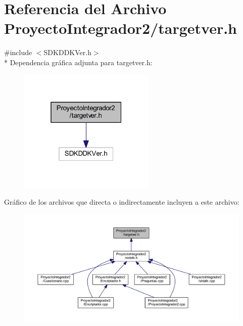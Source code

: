 \section{Referencia del Archivo Proyecto\-Integrador2/targetver.h}
\label{targetver_8h}
{\ttfamily \#include $<$S\-D\-K\-D\-D\-K\-Ver.\-h$>$}\\*
Dependencia gráfica adjunta para targetver.\-h\-:
\nopagebreak
\begin{figure}[H]
\begin{center}
\leavevmode
\includegraphics[width=184pt]{targetver_8h__incl}
\end{center}
\end{figure}
Gráfico de los archivos que directa o indirectamente incluyen a este archivo\-:
\nopagebreak
\begin{figure}[H]
\begin{center}
\leavevmode
\includegraphics[width=350pt]{targetver_8h__dep__incl}
\end{center}
\end{figure}
